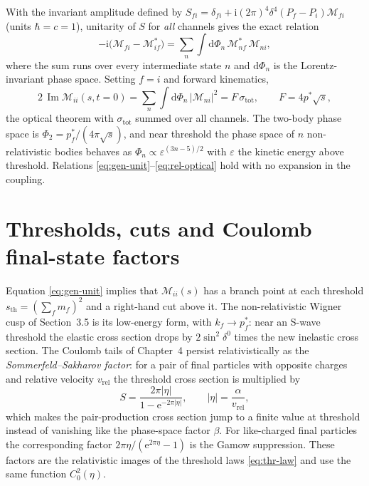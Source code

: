 \documentclass[11pt,a4paper]{book}
\numberwithin{equation}{chapter}
\newcommand{\dd}{\mathrm{d}}
\newcommand{\ii}{\mathrm{i}}
\newcommand{\ee}{\mathrm{e}}
\newcommand{\Imag}{\operatorname{Im}}
\begin{document}
With the invariant amplitude defined by
$S_{fi}=\delta_{fi}+\ii(2\pi)^4\delta^4(P_f-P_i)\mathcal M_{fi}$ (units
$\hbar=c=1$), unitarity of $S$ for \emph{all} channels gives the exact relation
\begin{equation}\label{eq:gen-unit}
  -\ii\bigl(\mathcal M_{fi}-\mathcal M^*_{if}\bigr)=\sum_n\int\dd\Phi_n\,
  \mathcal M^*_{nf}\,\mathcal M_{ni},
\end{equation}
where the sum runs over every intermediate state $n$ and $\dd\Phi_n$ is the
Lorentz-invariant phase space. Setting $f=i$ and forward kinematics,
\begin{equation}\label{eq:rel-optical}
  2\,\Imag\mathcal M_{ii}(s,t=0)=\sum_n\int\dd\Phi_n\,|\mathcal M_{ni}|^2
  =F\,\sigma_{\mathrm{tot}},\qquad F=4p^*\sqrt s,
\end{equation}
the optical theorem with $\sigma_{\mathrm{tot}}$ summed over all channels. The
two-body phase space is $\Phi_2=p_f^*/(4\pi\sqrt s)$, and near threshold the
phase space of $n$ non-relativistic bodies behaves as
$\Phi_n\propto\varepsilon^{(3n-5)/2}$ with $\varepsilon$ the kinetic energy above
threshold. Relations \eqref{eq:gen-unit}--\eqref{eq:rel-optical} hold with no
expansion in the coupling.

\section{Thresholds, cuts and Coulomb final-state factors}

Equation \eqref{eq:gen-unit} implies that $\mathcal M_{ii}(s)$ has a branch point at
each threshold $s_{\mathrm{th}}=(\sum_fm_f)^2$ and a right-hand cut above it. The
non-relativistic Wigner cusp of Section~3.5 is its low-energy form, with
$k_f\to p_f^*$: near an S-wave threshold the elastic cross section drops by
$2\sin^2\delta^0$ times the new inelastic cross section. The Coulomb tails of
Chapter~4 persist relativistically as the \emph{Sommerfeld--Sakharov factor}: for a pair
of final particles with opposite charges and relative velocity $v_{\mathrm{rel}}$
the threshold cross section is multiplied by
\begin{equation}\label{eq:sakharov}
  S=\frac{2\pi|\eta|}{1-\ee^{-2\pi|\eta|}},\qquad|\eta|=\frac{\alpha}{v_{\mathrm{rel}}},
\end{equation}
which makes the pair-production cross section jump to a finite value at threshold
instead of vanishing like the phase-space factor $\beta$. For like-charged final
particles the corresponding factor $2\pi\eta/(\ee^{2\pi\eta}-1)$ is the
Gamow suppression. These factors are the relativistic images of the threshold
laws \eqref{eq:thr-law} and use the same function $C_0^2(\eta)$.
\end{document}
